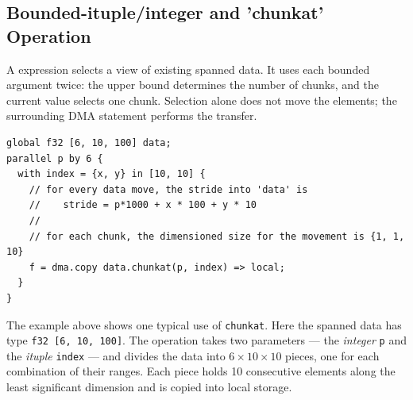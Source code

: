 \subsection*{Bounded-ituple/integer and 'chunkat' Operation}

A \co@chunkat@ expression selects a view of existing spanned data. It uses each bounded argument twice: the upper bound determines the number of chunks, and the current value selects one chunk. Selection alone does not move the elements; the surrounding DMA statement performs the transfer.

\begin{lstlisting}[language=croqtile,caption={Bounded-ituple/integer and chunkat Operation}]
global f32 [6, 10, 100] data;
parallel p by 6 {
  with index = {x, y} in [10, 10] {
    // for every data move, the stride into 'data' is
    //    stride = p*1000 + x * 100 + y * 10
    //
    // for each chunk, the dimensioned size for the movement is {1, 1, 10}
    f = dma.copy data.chunkat(p, index) => local;
  }
}
\end{lstlisting}

The example above shows one typical use of \texttt{chunkat}. Here the spanned data has type \texttt{f32 [6, 10, 100]}. The operation takes two parameters --- the \emph{integer} \texttt{p} and the \emph{ituple} \texttt{index} --- and divides the data into \(6 \times 10 \times 10\) pieces, one for each combination of their ranges. Each piece holds 10 consecutive elements along the least significant dimension and is copied into local storage.
